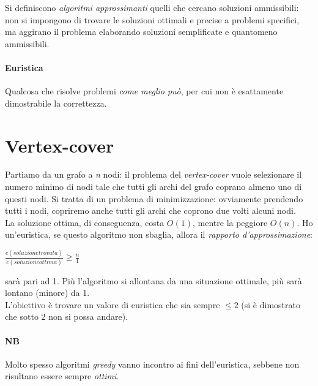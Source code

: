 Si definiscono \textit{algoritmi approssimanti} quelli che cercano soluzioni ammissibili: non si impongono di trovare le soluzioni ottimali e precise a problemi specifici, ma aggirano il problema elaborando soluzioni semplificate e quantomeno ammissibili.

\paragraph{Euristica}
Qualcosa che risolve problemi \textit{come meglio può}, per cui non è esattamente dimostrabile la correttezza.

\section{Vertex-cover}
Partiamo da un grafo a \textit{n} nodi: il problema del \textit{vertex-cover} vuole selezionare il numero minimo di nodi tale che tutti gli archi del grafo coprano almeno uno di questi nodi.
Si tratta di un problema di minimizzazione: ovviamente prendendo tutti i nodi, copriremo anche tutti gli archi che coprono due volti alcuni nodi. \\
La soluzione ottima, di conseguenza, costa $O(1)$, mentre la peggiore $O(n)$.
Ho un'euristica, se questo algoritmo non sbaglia, allora il \textit{rapporto d'approssimazione}:
\begin{center}
	$\frac{c(soluzione trovata)}{c(soluzione ottima)} \geq \frac{n}{1}$
\end{center}
sarà pari ad 1. Più l'algoritmo si allontana da una situazione ottimale, più sarà lontano (minore) da 1. \\
L'obiettivo è trovare un valore di euristica che sia sempre $\leq 2$ (si è dimostrato che sotto 2 non si possa andare).

\paragraph{NB}
Molto spesso algoritmi \textit{greedy} vanno incontro ai fini dell'euristica, sebbene non risultano essere sempre \textit{ottimi}. \\ \\

